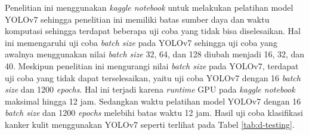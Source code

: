 Penelitian ini menggunakan \textit{kaggle notebook} untuk melakukan pelatihan model YOLOv7 sehingga penelitian ini memiliki batas sumber daya dan waktu komputasi sehingga terdapat beberapa uji coba yang tidak bisa diselesaikan. Hal ini memengaruhi uji coba \textit{batch size} pada YOLOv7 sehingga uji coba yang awalnya menggunakan nilai \textit{batch size} 32, 64, dan 128 diubah menjadi 16, 32, dan 40. Meskipun penelitian ini mengurangi nilai \textit{batch size} pada YOLOv7, terdapat uji coba yang tidak dapat terselesaikan, yaitu uji coba YOLOv7 dengan 16 \textit{batch size} dan 1200 \textit{epochs}. Hal ini terjadi karena \textit{runtime} GPU pada \textit{kaggle notebook} maksimal hingga 12 jam. Sedangkan waktu pelatihan model YOLOv7 dengan 16 \textit{batch size} dan 1200 \textit{epochs} melebihi batas waktu 12 jam. Hasil uji coba klasifikasi kanker kulit menggunakan YOLOv7 seperti terlihat pada Tabel \ref{tab:d-testing}.

